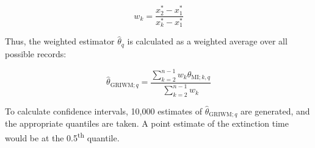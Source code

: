 \[
w_k = \frac{x^*_{2} - x^*_{1}}{x^*_{k} - x^*_{1}}
\]

Thus, the weighted estimator $\hat\theta_{q}$ is calculated as a weighted average over all possible records:

\begin{equation}\label{eq:griwm1}
    \hat\theta_{\text{GRIWM}; q} = \frac{\sum_{k=2}^{n-1} w_k \hat\theta_{\text{MI}; k, q}}{\sum_{k=2}^{n-1} w_k}
\end{equation}

To calculate confidence intervals, 10,000 estimates of $\hat\theta_{\text{GRIWM}; q}$ are generated, and the appropriate quantiles are taken. A point estimate of the extinction time would be at the 0.5\textsuperscript{th} quantile.






